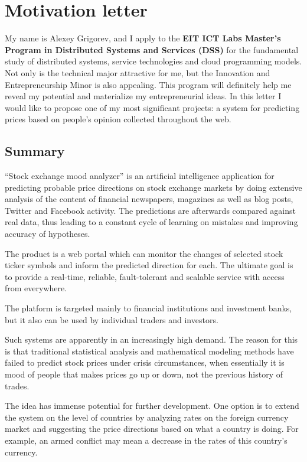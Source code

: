 \documentclass[a4paper,12pt]{article}
\begin{document}
\section*{Motivation letter}

My name is Alexey Grigorev, and I apply to the \textbf{EIT ICT Labs Master's Program in Distributed Systems and Services (DSS)} for the fundamental study of distributed systems, service technologies and cloud programming models. Not only is the technical major attractive for me, but the Innovation and Entrepreneurship Minor is also appealing. This program will definitely help me reveal my potential and materialize my entrepreneurial ideas. In this letter I would like to propose one of my most significant projects: a system for predicting prices based on people's opinion collected throughout the web.

\subsection*{Summary}

``Stock exchange mood analyzer'' is an artificial intelligence application for predicting probable price directions on stock exchange markets by doing extensive analysis of the content of financial newspapers, magazines as well as blog posts, Twitter and Facebook activity. The predictions are afterwards compared against real data, thus leading to a constant cycle of learning on mistakes and improving accuracy of hypotheses.

The product is a web portal which can monitor the changes of selected stock ticker symbols and inform the predicted direction for each. The ultimate goal is to provide a real-time, reliable, fault-tolerant and scalable service with access from everywhere.

The platform is targeted mainly to financial institutions and investment banks, but it also can be used by individual traders and investors.

Such systems are apparently in an increasingly high demand. The reason for this is that traditional statistical analysis and mathematical modeling methods have failed to predict stock prices under crisis circumstances, when essentially it is mood of people that makes prices go up or down, not the previous history of trades.

The idea has immense potential for further development. One option is to extend the system on the level of countries by analyzing rates on the foreign currency market and suggesting the price directions based on what a country is doing. For example, an armed conflict may mean a decrease in the rates of this country's currency.
\end{document}
